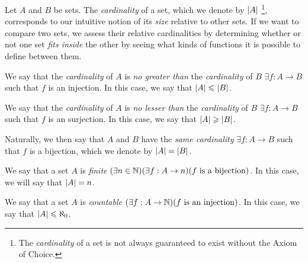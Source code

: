 \begin{definition}[Cardinality]
    Let $A$ and $B$ be sets.
    The \emph{cardinality} of a set,
    which we denote by $\lvert A\rvert$%
    \footnote{The \emph{cardinality} of a set is not always guaranteed to exist without the Axiom of Choice.},
    corresponds to our intuitive notion of its \emph{size} relative to other sets.
    If we want to compare two sets,
    we assess their relative cardinalities by determining whether or not one set \emph{fits inside} the other
    by seeing what kinds of functions it is possible to define between them.

    We say that the \emph{cardinality} of $A$ is \emph{no greater than} the \emph{cardinality} of $B$
    \iffbydefn $\exists f: A \to B$ such that $f$ is an injection.
    In this case, we say that $\lvert A\rvert \leqslant \lvert B\rvert$.

    We say that the \emph{cardinality} of $A$ is \emph{no lesser than} the \emph{cardinality} of $B$
    \iffbydefn $\exists f: A \to B$ such that $f$ is an surjection.
    In this case, we say that $\lvert A\rvert \geqslant \lvert B\rvert$.

    Naturally, we then say that $A$ and $B$ have the \emph{same cardinality}
    \iffbydefn $\exists f: A \to B$ such that $f$ is a bijection,
    which we denote by $\lvert A\rvert = \lvert B\rvert$.
\end{definition}

\begin{definition}
    We say that a set $A$ is \emph{finite}
    \iffbydefn $\pn*{\exists n \in \N}\pn*{\exists f: A \to n}\pn*{f \text{ is a bijection}}$.
    In this case, we will say that $\lvert A\rvert = n$.
\end{definition}

\begin{definition}
    We say that a set $A$ is \emph{countable} \iffbydefn
    $\pn*{\exists f: A \to \N}\pn*{f \text{ is an injection}}$.
    In this case, we say that $\lvert A\rvert \leqslant \aleph_0$.
\end{definition}


